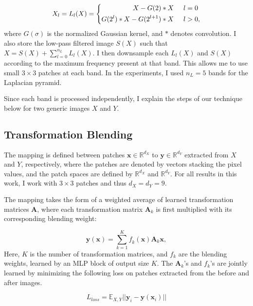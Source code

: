 \begin{equation} 
	X_l = L_l(X) = 
 \left \{ \begin{aligned}
        X - G(2) \ast X \hspace{5mm} &l=0\\
        G(2^l) \ast X - G(2^{l+1}) \ast X \hspace{5mm} &l>0,
       \end{aligned}
 \right.
\end{equation}
where $G(\sigma)$ is the normalized Gaussian kernel, and $\ast$ denotes convolution. I also store the low-pass filtered image $S(X)$ such that $X = S(X) + \sum_{l=0}^{n_L} L_l(X)$. I then downsample each $L_l(X)$ and $S(X)$ according to the maximum frequency present at that band. This allows me to use small $3 \times 3$ patches at each band. In the experiments, I used $n_L = 5$ bands for the Laplacian pyramid.


Since each band is processed independently, I explain the steps of our technique below for two generic images $X$ and $Y$.


\subsection{Transformation Blending}\label{sec:Blending}

The mapping is defined between patches $\mathbf{x} \in \mathbb{R}^{d_X}$ to $\mathbf{y} \in \mathbb{R}^{d_Y}$ extracted from $X$ and $Y$, respectively, where the patches are denoted by vectors stacking the pixel values, and the patch spaces are defined by $\mathbb{R}^{d_X}$ and  $\mathbb{R}^{d_Y}$. For all results in this work, I work with $3 \times 3$ patches and thus $d_X = d_Y = 9$.

The mapping takes the form of a weighted average of learned transformation matrices $\mathbf{A}$, where each transformation matrix $\mathbf{A}_k$ is first multiplied with its corresponding blending weight: 

\begin{equation} 
	\mathbf{y} (\mathbf{x}) = \sum_{k=1}^K
	\mathit{f}_k (\mathbf{x}) \mathbf{A}_k \mathbf{x},
	\label{eq:weightedSum}
\end{equation} 
Here, $K$ is the number of transformation matrices, and $f_k$ are the blending weights, learned by an MLP block of output size $K$. The $\mathbf{A}_k$'s and $f_k$'s are jointly learned by minimizing the following loss on patches extracted from the before and after images.

\begin{equation}
    L_{loss}  = \mathbb{E}_{X, Y} || \mathbf{y}_i -   \mathbf{y} (\mathbf{x}_i) ||
\end{equation}

